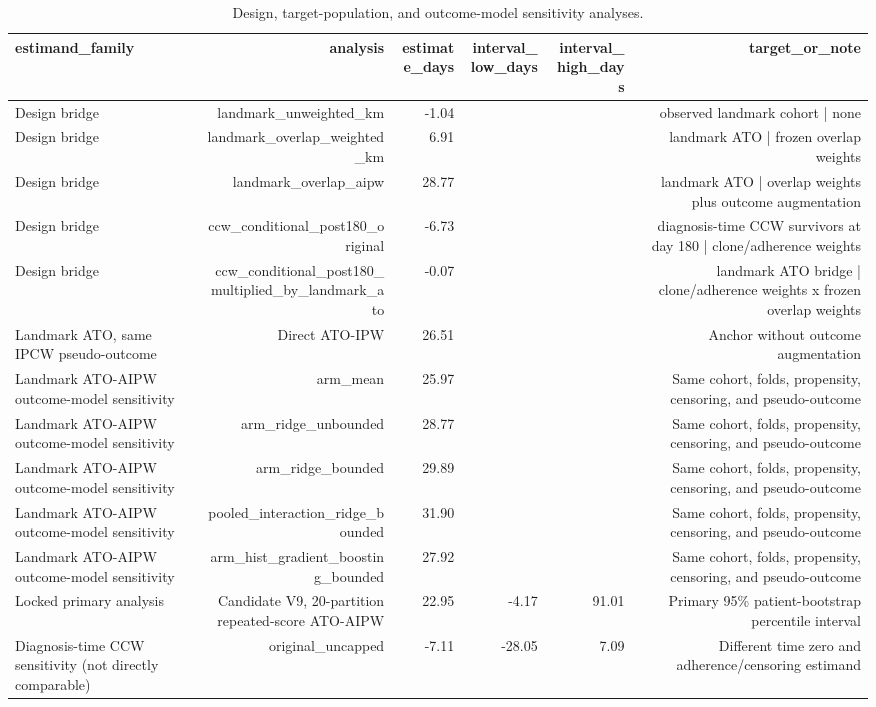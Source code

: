\begin{table}[htbp]
\centering
\caption{Design, target-population, and outcome-model sensitivity analyses.}
\label{tab:design_model_sensitivity}
\small
\begin{tabular}{lrrrrr}
\toprule
estimand\_family & analysis & estimate\_days & interval\_low\_days & interval\_high\_days & target\_or\_note \\
\midrule
Design bridge & landmark\_unweighted\_km & -1.04 &  &  & observed landmark cohort | none \\
Design bridge & landmark\_overlap\_weighted\_km & 6.91 &  &  & landmark ATO | frozen overlap weights \\
Design bridge & landmark\_overlap\_aipw & 28.77 &  &  & landmark ATO | overlap weights plus outcome augmentation \\
Design bridge & ccw\_conditional\_post180\_original & -6.73 &  &  & diagnosis-time CCW survivors at day 180 | clone/adherence weights \\
Design bridge & ccw\_conditional\_post180\_multiplied\_by\_landmark\_ato & -0.07 &  &  & landmark ATO bridge | clone/adherence weights x frozen overlap weights \\
Landmark ATO, same IPCW pseudo-outcome & Direct ATO-IPW & 26.51 &  &  & Anchor without outcome augmentation \\
Landmark ATO-AIPW outcome-model sensitivity & arm\_mean & 25.97 &  &  & Same cohort, folds, propensity, censoring, and pseudo-outcome \\
Landmark ATO-AIPW outcome-model sensitivity & arm\_ridge\_unbounded & 28.77 &  &  & Same cohort, folds, propensity, censoring, and pseudo-outcome \\
Landmark ATO-AIPW outcome-model sensitivity & arm\_ridge\_bounded & 29.89 &  &  & Same cohort, folds, propensity, censoring, and pseudo-outcome \\
Landmark ATO-AIPW outcome-model sensitivity & pooled\_interaction\_ridge\_bounded & 31.90 &  &  & Same cohort, folds, propensity, censoring, and pseudo-outcome \\
Landmark ATO-AIPW outcome-model sensitivity & arm\_hist\_gradient\_boosting\_bounded & 27.92 &  &  & Same cohort, folds, propensity, censoring, and pseudo-outcome \\
Locked primary analysis & Candidate V9, 20-partition repeated-score ATO-AIPW & 22.95 & -4.17 & 91.01 & Primary 95\% patient-bootstrap percentile interval \\
Diagnosis-time CCW sensitivity (not directly comparable) & original\_uncapped & -7.11 & -28.05 & 7.09 & Different time zero and adherence/censoring estimand \\

\end{tabular}
\end{table}
